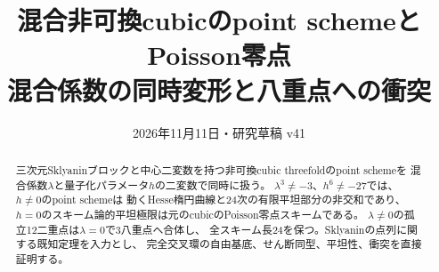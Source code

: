 \documentclass[a4paper,11pt]{ltjsarticle}
\title{混合非可換cubicのpoint schemeとPoisson零点\\\large 混合係数の同時変形と八重点への衝突}
\author{}\date{2026年11月11日・研究草稿 v41}
\theoremstyle{remark}\newtheorem{remark}[theorem]{注意}
\begin{document}
\maketitle
\begin{abstract}
三次元Sklyaninブロックと中心二変数を持つ非可換cubic threefoldのpoint schemeを
混合係数$\lambda$と量子化パラメータ$h$の二変数で同時に扱う。
$\lambda^3\ne-3$、$h^6\ne-27$では、$h\ne0$のpoint schemeは
動くHesse楕円曲線と24次の有限平坦部分の非交和であり、
$h=0$のスキーム論的平坦極限は元のcubicのPoisson零点スキームである。
$\lambda\ne0$の孤立12二重点は$\lambda=0$で3八重点へ合体し、
全スキーム長24を保つ。Sklyaninの点列に関する既知定理を入力とし、
完全交叉環の自由基底、せん断同型、平坦性、衝突を直接証明する。
\end{abstract}

\end{document}
